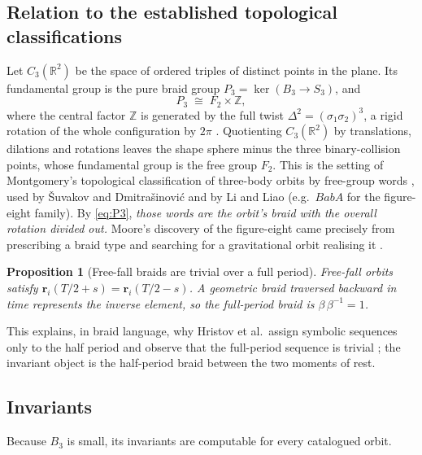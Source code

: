 \documentclass[11pt]{article}
\newtheorem{proposition}{Proposition}
\theoremstyle{remark}
\newcommand{\R}{\mathbb{R}}
\newcommand{\Z}{\mathbb{Z}}
\begin{document}
\subsection{Relation to the established topological classifications}

Let $C_3(\R^2)$ be the space of ordered triples of distinct points in the plane. Its fundamental group is the
pure braid group $P_3=\ker(B_3\to S_3)$, and
\begin{equation}
  P_3\;\cong\;F_2\times\Z ,
  \label{eq:P3}
\end{equation}
where the central factor $\Z$ is generated by the full twist $\Delta^2=(\sigma_1\sigma_2)^3$, a rigid rotation
of the whole configuration by $2\pi$ \cite{KasselTuraev2008,Birman1974}. Quotienting $C_3(\R^2)$ by
translations, dilations and rotations leaves the shape sphere minus the three binary-collision points, whose
fundamental group is the free group $F_2$. This is the setting of Montgomery's topological classification of
three-body orbits by free-group words \cite{Montgomery1998}, used by \v{S}uvakov and Dmitra\v{s}inovi\'c and by
Li and Liao (e.g.\ $BabA$ for the figure-eight family). By \eqref{eq:P3}, \emph{those words are the
orbit's braid with the overall rotation divided out.} Moore's discovery of the figure-eight came precisely from
prescribing a braid type and searching for a gravitational orbit realising it \cite{Moore1993}.

\begin{proposition}[Free-fall braids are trivial over a full period]
\label{prop:freefall}
Free-fall orbits satisfy $\mathbf r_i(T/2+s)=\mathbf r_i(T/2-s)$. A geometric braid traversed backward in time
represents the inverse element, so the full-period braid is $\beta\,\beta^{-1}=1$.
\end{proposition}
\noindent This explains, in braid language, why Hristov et al.\ assign symbolic sequences only to the half
period and observe that the full-period sequence is trivial \cite{Hristov2024}; the invariant object is the
half-period braid between the two moments of rest.

\subsection{Invariants}

Because $B_3$ is small, its invariants are computable for every catalogued orbit.
\end{document}
